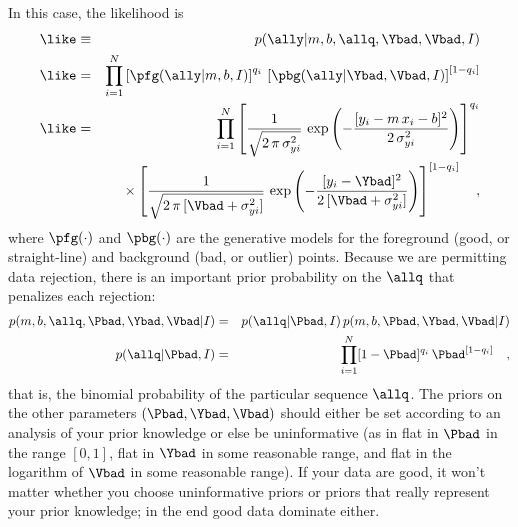\documentclass[12pt,twoside,pdftex]{article}
\begin{document}
In this case, the likelihood is
\begin{eqnarray}\displaystyle
\like &\equiv& p(\ally|m,b,\allq,\Ybad,\Vbad,I)
 \nonumber\\
\like &=& \prod_{i=1}^N
 \left[\pfg(\ally|m,b,I)\right]^{q_i}\,
 \left[\pbg(\ally|\Ybad,\Vbad,I)\right]^{[1-q_i]}
 \nonumber\\
\like &=& \prod_{i=1}^N \left[\frac{1}{\sqrt{2\,\pi\,\sigma_{yi}^2}}
 \,\exp\left(-\frac{[y_i-m\,x_i-b]^2}{2\,\sigma_{yi}^2}\right)\right]^{q_i}
 \nonumber \\ & & \quad\times
 \left[\frac{1}{\sqrt{2\,\pi\,[\Vbad+\sigma_{yi}^2]}}
 \,\exp\left(-\frac{[y_i-\Ybad]^2}{2\,[\Vbad+\sigma_{yi}^2]}\right)\right]^{[1-q_i]}
 \quad ,
\end{eqnarray}
where $\pfg(\cdot)$ and $\pbg(\cdot)$ are the generative models for
the foreground (good, or straight-line) and background (bad, or
outlier) points.  Because we are permitting data rejection, there is
an important prior probability on the $\allq$ that penalizes each
rejection:
\begin{eqnarray}\displaystyle
p(m,b,\allq,\Pbad,\Ybad,\Vbad|I)
 &=& p(\allq|\Pbad,I)\,p(m,b,\Pbad,\Ybad,\Vbad|I)
 \nonumber\\
p(\allq|\Pbad,I)
 &=& \prod_{i=1}^N[1-\Pbad]^{q_i}\,\Pbad^{[1-q_i]}
 \quad ,
\end{eqnarray}
that is, the binomial probability of the particular sequence $\allq$.
The priors on the other parameters $(\Pbad,\Ybad,\Vbad)$ should either
be set according to an analysis of your prior knowledge or else be
uninformative (as in flat in $\Pbad$ in the range $[0,1]$, flat in
$\Ybad$ in some reasonable range, and flat in the logarithm of $\Vbad$
in some reasonable range).  If your data are good, it won't matter
whether you choose uninformative priors or priors that really
represent your prior knowledge; in the end good data dominate either.
\end{document}
